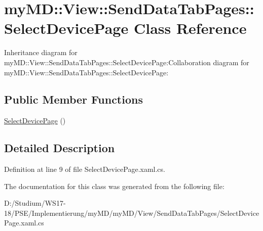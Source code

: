 \hypertarget{classmy_m_d_1_1_view_1_1_send_data_tab_pages_1_1_select_device_page}{
\section{my\-MD::View::Send\-Data\-Tab\-Pages::Select\-Device\-Page Class Reference}
\label{d4/ddc/classmy_m_d_1_1_view_1_1_send_data_tab_pages_1_1_select_device_page}
}
Inheritance diagram for my\-MD::View::Send\-Data\-Tab\-Pages::Select\-Device\-Page:Collaboration diagram for my\-MD::View::Send\-Data\-Tab\-Pages::Select\-Device\-Page:\subsection*{Public Member Functions}
\begin{CompactItemize}
\item 
\hypertarget{classmy_m_d_1_1_view_1_1_send_data_tab_pages_1_1_select_device_page_f4b3bff3931cce7e6c07963639304552}{
\hyperlink{classmy_m_d_1_1_view_1_1_send_data_tab_pages_1_1_select_device_page_f4b3bff3931cce7e6c07963639304552}{Select\-Device\-Page} ()}
\label{d4/ddc/classmy_m_d_1_1_view_1_1_send_data_tab_pages_1_1_select_device_page_f4b3bff3931cce7e6c07963639304552}

\end{CompactItemize}


\subsection{Detailed Description}




Definition at line 9 of file Select\-Device\-Page.xaml.cs.

The documentation for this class was generated from the following file:\begin{CompactItemize}
\item 
D:/Studium/WS17-18/PSE/Implementierung/my\-MD/my\-MD/View/Send\-Data\-Tab\-Pages/Select\-Device\-Page.xaml.cs\end{CompactItemize}
